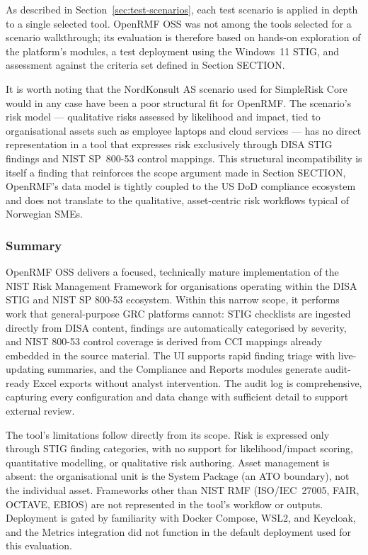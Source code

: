As described in Section~\ref{sec:test-scenarios}, each test scenario is applied in
depth to a single selected tool. OpenRMF OSS was not among the tools selected
for a scenario walkthrough; its evaluation is therefore based on hands-on
exploration of the platform's modules, a test deployment using the Windows~11
STIG, and assessment against the criteria set defined in
Section SECTION. %

It is worth noting that the NordKonsult AS scenario used for SimpleRisk Core
would in any case have been a poor structural fit for OpenRMF. The scenario's
risk model — qualitative risks assessed by likelihood and impact, tied to
organisational assets such as employee laptops and cloud services — has no
direct representation in a tool that expresses risk exclusively through DISA
STIG findings and NIST SP~800-53 control mappings. This structural
incompatibility is itself a finding that reinforces the scope argument made
in Section SECTION, %
OpenRMF's data model is tightly coupled to the US DoD compliance ecosystem
and does not translate to the qualitative, asset-centric risk workflows
typical of Norwegian SMEs.

\subsubsection{Summary}

OpenRMF OSS delivers a focused, technically mature implementation of the
NIST Risk Management Framework for organisations operating within the DISA
STIG and NIST SP 800-53 ecosystem. Within this narrow scope, it performs
work that general-purpose GRC platforms cannot: STIG checklists are ingested
directly from DISA content, findings are automatically categorised by
severity, and NIST 800-53 control coverage is derived from CCI mappings
already embedded in the source material. The UI supports rapid finding
triage with live-updating summaries, and the Compliance and Reports modules
generate audit-ready Excel exports without analyst intervention. The audit
log is comprehensive, capturing every configuration and data change with
sufficient detail to support external review.

The tool's limitations follow directly from its scope. Risk is expressed
only through STIG finding categories, with no support for likelihood/impact
scoring, quantitative modelling, or qualitative risk authoring. Asset
management is absent: the organisational unit is the System Package (an ATO
boundary), not the individual asset. Frameworks other than NIST RMF
(ISO/IEC~27005, FAIR, OCTAVE, EBIOS) are not represented in the tool's
workflow or outputs. Deployment is gated by familiarity with Docker Compose,
WSL2, and Keycloak, and the Metrics integration did not function in the
default deployment used for this evaluation.

